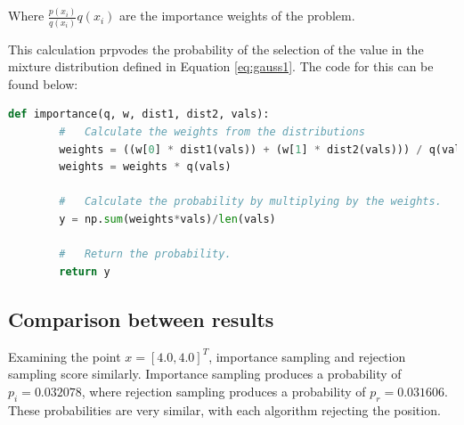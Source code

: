\documentclass[a4paper, 11pt]{article}
\begin{document}
Where $\frac{p(x_i)}{q(x_i)} q(x_i)$ are the importance weights of the problem. 

This calculation prpvodes the probability of the selection of the value in the mixture distribution defined in Equation \ref*{eq:gauss1}. The code for this can be found below:
\begin{lstlisting}[language=Python, caption=Importance Sampling Code.]
    def importance(q, w, dist1, dist2, vals):
        #   Calculate the weights from the distributions
        weights = ((w[0] * dist1(vals)) + (w[1] * dist2(vals))) / q(vals) #np.sum(((w[0] * dist1(samples)) + (w[1] * dist2(samples))))
        weights = weights * q(vals)

        #   Calculate the probability by multiplying by the weights.
        y = np.sum(weights*vals)/len(vals)

        #   Return the probability.
        return y
\end{lstlisting}

\subsection*{Comparison between results}

Examining the point $x = [4.0, 4.0]^T$, importance sampling and rejection sampling score similarly. Importance sampling produces a probability of $p_i = 0.032078$, where rejection sampling produces a probability of $p_r = 0.031606$. These probabilities are very similar, with each algorithm rejecting the position. 
\pagebreak




\end{document}
